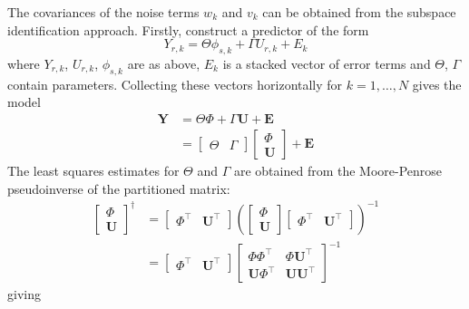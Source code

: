 \documentclass[11pt]{report} %
\begin{document}
The covariances of the noise terms $w_{k}$ and $v_{k}$ can be obtained from the subspace identification approach. Firstly, construct a predictor of the form
\begin{equation}
Y_{r, k} = \Theta \phi_{s, k} + \Gamma U_{r, k} + E_{k}
\end{equation}
where $Y_{r, k}$, $U_{r, k}$, $\phi_{s, k}$ are as above, $E_{k}$ is a stacked vector of error terms and $\Theta$, $\Gamma$ contain parameters. Collecting these vectors horizontally for $k = 1, \dots, N$ gives the model
\begin{align}
\mathbf{Y} &= \Theta \Phi + \Gamma\mathbf{U} + \mathbf{E} \\
&= \begin{bmatrix}
\Theta & \Gamma
\end{bmatrix}\begin{bmatrix}
\Phi \\ \mathbf{U}
\end{bmatrix} + \mathbf{E}
\end{align}
The least squares estimates for $\Theta$ and $\Gamma$ are obtained from the Moore-Penrose pseudoinverse of the partitioned matrix:
\begin{align}
\begin{bmatrix}
\Phi \\ \mathbf{U}
\end{bmatrix}^{\dagger} &= \begin{bmatrix}
\Phi^{\top} & \mathbf{U}^{\top}\end{bmatrix}\left(\begin{bmatrix}
\Phi \\ \mathbf{U}
\end{bmatrix}\begin{bmatrix}
\Phi^{\top} & \mathbf{U}^{\top}
\end{bmatrix}\right)^{-1} \\
&= \begin{bmatrix}
\Phi^{\top} & \mathbf{U}^{\top}\end{bmatrix}\begin{bmatrix}
\Phi\Phi^{\top} & \Phi\mathbf{U}^{\top} \\ \mathbf{U}\Phi^{\top} & \mathbf{U}\mathbf{U}^{\top}
\end{bmatrix}^{-1}
\end{align}
giving
\end{document}
